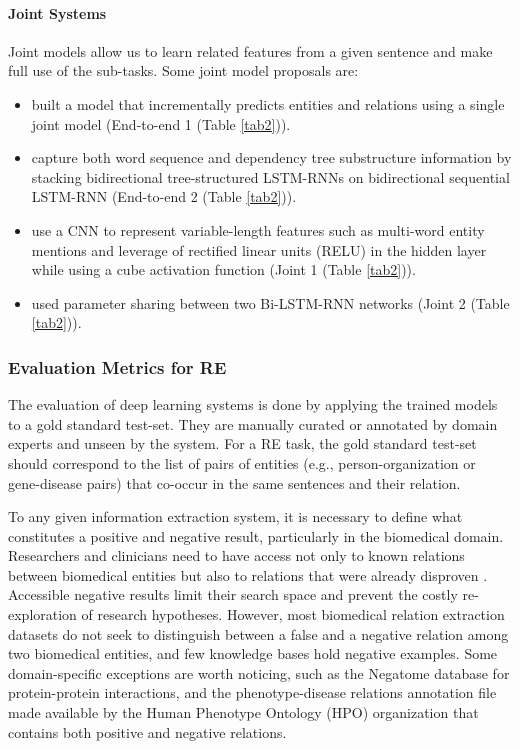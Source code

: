 \paragraph{Joint Systems}

Joint models allow us to learn related features from a given sentence and make full use of the sub-tasks. Some joint model proposals are:

\begin{itemize}
    \item \cite{li2014incremental} built a model that incrementally predicts entities and relations using a single joint model (End-to-end 1 (Table \ref{tab2})).
    \item \cite{miwa2016end} capture both word sequence and dependency tree substructure information by stacking bidirectional tree-structured LSTM-RNNs on bidirectional sequential LSTM-RNN (End-to-end 2 (Table \ref{tab2})).
    \item \cite{li2016joint} use a CNN to represent variable-length features such as multi-word entity mentions and leverage of rectified linear units (RELU) in the hidden layer while using a cube activation function (Joint 1 (Table \ref{tab2})).
    \item \cite{li2017neural} used parameter sharing between two Bi-LSTM-RNN networks (Joint 2 (Table \ref{tab2})).
\end{itemize}



\subsubsection{Evaluation Metrics for RE}

The evaluation of deep learning systems is done by applying the trained models to a gold standard test-set. They are manually curated or annotated by domain experts and unseen by the system. For a RE task, the gold standard test-set should correspond to the list of pairs of entities (e.g., person-organization or gene-disease pairs) that co-occur in the same sentences and their relation.

To any given information extraction system, it is necessary to define what constitutes a positive and negative result, particularly in the biomedical domain. Researchers and clinicians need to have access not only to known relations between biomedical entities but also to relations that were already disproven \citep{sousa2020improving}. Accessible negative results limit their search space and prevent the costly re-exploration of research hypotheses. However, most biomedical relation extraction datasets do not seek to distinguish between a false and a negative relation among two biomedical entities, and few knowledge bases hold negative examples. Some domain-specific exceptions are worth noticing, such as the Negatome database \citep{blohm2014negatome} for protein-protein interactions, and the phenotype-disease relations annotation file made available by the Human Phenotype Ontology (HPO) organization \citep{robinson2010human} that contains both positive and negative relations.


